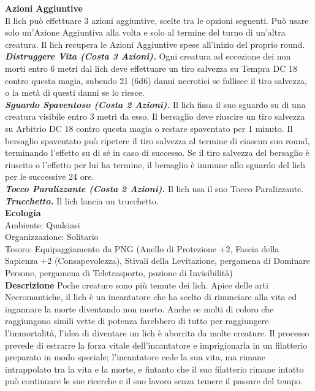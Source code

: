 \begin{multicols}{2}
\textbf{Azioni Aggiuntive}\\

Il lich può effettuare 3 azioni aggiuntive, scelte tra le opzioni seguenti. Può usare solo un'Azione Aggiuntiva alla volta e solo al termine del turno di un'altra creatura. Il lich recupera le Azioni Aggiuntive spese all'inizio del proprio round.\\

\emph{\textbf{Distruggere Vita (Costa 3 Azioni).}} Ogni creatura ad eccezione dei non morti entro 6 metri dal lich deve effettuare un tiro salvezza su Tempra DC 18 contro questa magia, subendo 21 (6d6) danni necrotici se fallisce il tiro salvezza, o la metà di questi danni se lo riesce.\\

\emph{\textbf{Sguardo Spaventoso (Costa 2 Azioni).}} Il lich fissa il suo sguardo su di una creatura visibile entro 3 metri da esso. Il bersaglio deve riuscire un tiro salvezza su Arbitrio DC 18 contro questa magia o restare spaventato per 1 minuto. Il bersaglio spaventato può ripetere il tiro salvezza al termine di ciascun suo round, terminando l'effetto su di sé in caso di successo. Se il tiro salvezza del bersaglio è riuscito o l'effetto per lui ha termine, il bersaglio è immune allo sguardo del lich per le successive 24 ore.\\

\emph{\textbf{Tocco Paralizzante (Costa 2 Azioni).}} Il lich usa il suo Tocco Paralizzante.\\

\emph{\textbf{Trucchetto.}} Il lich lancia un trucchetto.\\

\textbf{Ecologia}\\
Ambiente: Qualsiasi\\
Organizzazione: Solitario\\
Tesoro: Equipaggiamento da PNG (Anello di Protezione +2, Fascia della Sapienza +2 (Consapevolezza), Stivali della Levitazione, pergamena di Dominare Persone, pergamena di Teletrasporto, pozione di Invisibilità)\\

\textbf{Descrizione}
Poche creature sono più temute dei lich. Apice delle arti Necromantiche, il lich è un incantatore che ha scelto di rinunciare alla vita ed ingannare la morte diventando non morto. Anche se molti di coloro che raggiungono simili vette di potenza farebbero di tutto per raggiungere l’immortalità, l’idea di diventare un lich è aborrita da molte creature. Il processo prevede di estrarre la forza vitale dell’incantatore e imprigionarla in un filatterio preparato in modo speciale; l’incantatore cede la sua vita, ma rimane intrappolato tra la vita e la morte, e fintanto che il suo filatterio rimane intatto può continuare le sue ricerche e il suo lavoro senza temere il passare del tempo.\\



\end{multicols}
